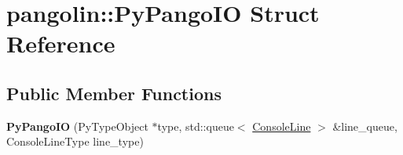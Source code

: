 \hypertarget{structpangolin_1_1_py_pango_i_o}{}\section{pangolin\+:\+:Py\+Pango\+IO Struct Reference}
\label{structpangolin_1_1_py_pango_i_o}
\subsection*{Public Member Functions}
\begin{DoxyCompactItemize}
\item 
{\bfseries Py\+Pango\+IO} (Py\+Type\+Object $\ast$type, std\+::queue$<$ \hyperlink{classpangolin_1_1_console_line}{Console\+Line} $>$ \&line\+\_\+queue, Console\+Line\+Type line\+\_\+type)\hypertarget{structpangolin_1_1_py_pango_i_o_affd65261e9aa4ae6d79eca020836f219}{}\label{structpangolin_1_1_py_pango_i_o_affd65261e9aa4ae6d79eca020836f219}

\end{DoxyCompactItemize}
